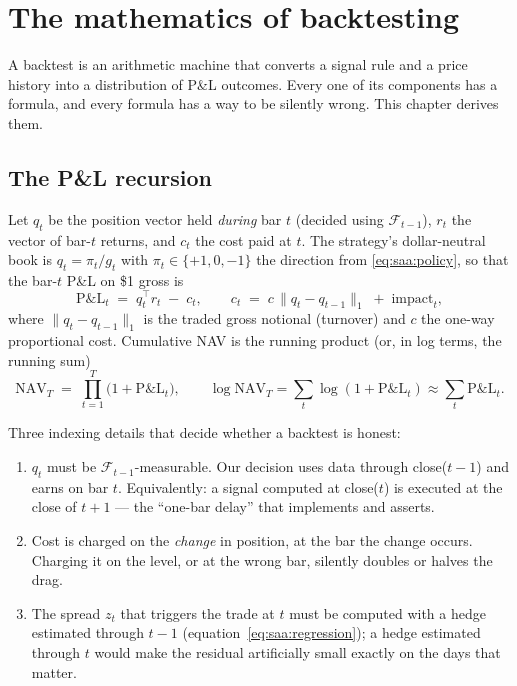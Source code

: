\section{The mathematics of backtesting}
\label{ch:backtestmath}

A backtest is an arithmetic machine that converts a signal rule and a price history into
a distribution of P\&L outcomes. Every one of its components has a formula, and every
formula has a way to be silently wrong. This chapter derives them.

\subsection{The P\&L recursion}
\label{sec:bt:recursion}

Let $q_t$ be the position vector held \emph{during} bar $t$ (decided using
$\mathcal F_{t-1}$), $r_t$ the vector of bar-$t$ returns, and $c_t$ the cost paid at
$t$. The strategy's dollar-neutral book is $q_t = \pi_t/g_t$ with $\pi_t\in\{+1,0,-1\}$
the direction from \eqref{eq:saa:policy}, so that the bar-$t$ P\&L on \$1 gross is
\begin{equation}
  \mathrm{P\&L}_t \;=\; q_t^{\top}r_t \;-\; c_t,
  \qquad
  c_t \;=\; c\,\lVert q_t - q_{t-1}\rVert_1 \;+\; \text{impact}_t ,
  \label{eq:bt:pnl}
\end{equation}
where $\lVert q_t-q_{t-1}\rVert_1$ is the traded gross notional (turnover) and $c$ the
one-way proportional cost. Cumulative NAV is the running product (or, in log terms, the
running sum)
\begin{equation}
  \mathrm{NAV}_T \;=\; \prod_{t=1}^{T}\bigl(1+\mathrm{P\&L}_t\bigr),
  \qquad
  \log\mathrm{NAV}_T = \sum_{t}\log(1+\mathrm{P\&L}_t)\approx\sum_t \mathrm{P\&L}_t .
  \label{eq:bt:nav}
\end{equation}

Three indexing details that decide whether a backtest is honest:
\begin{enumerate}
  \item $q_t$ must be $\mathcal F_{t-1}$-measurable. Our decision uses data through
    close($t-1$) and earns on bar $t$. Equivalently: a signal computed at close($t$) is
    executed at the close of $t+1$ --- the ``one-bar delay'' that
     implements and 
    asserts.
  \item Cost is charged on the \emph{change} in position, at the bar the change occurs.
    Charging it on the level, or at the wrong bar, silently doubles or halves the drag.
  \item The spread $z_t$ that triggers the trade at $t$ must be computed with a hedge
    estimated through $t-1$ (equation~\eqref{eq:saa:regression}); a hedge estimated
    through $t$ would make the residual artificially small exactly on the days that
    matter.
\end{enumerate}

